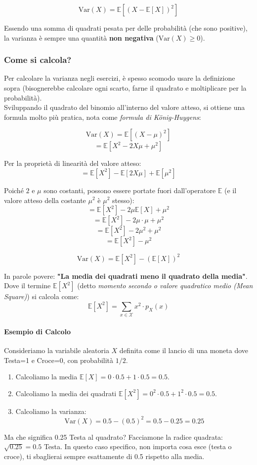 \begin{equation}
\boxed{\text{Var}(X) = \mathbb{E}\left[ (X - \mathbb{E}[X])^2 \right]}
\end{equation}

Essendo una somma di quadrati pesata per delle probabilità (che sono positive), la varianza è sempre una quantità \textbf{non negativa} ($\text{Var}(X) \ge 0$).

\subsubsection{Come si calcola?}

Per calcolare la varianza negli esercizi, è spesso scomodo usare la definizione sopra (bisognerebbe calcolare ogni scarto, farne il quadrato e moltiplicare per la probabilità).
\\Sviluppando il quadrato del binomio all'interno del valore atteso, si ottiene una formula molto più pratica, nota come \textit{formula di König-Huygens}:

$$ \text{Var}(X) = \mathbb{E}[(X - \mu)^2] $$
$$ = \mathbb{E}[X^2 - 2X\mu + \mu^2] $$

Per la proprietà di linearità del valore atteso:
$$ = \mathbb{E}[X^2] - \mathbb{E}[2X\mu] + \mathbb{E}[\mu^2] $$

Poiché $2$ e $\mu$ sono costanti, possono essere portate fuori dall'operatore $\mathbb{E}$ (e il valore atteso della costante $\mu^2$ è $\mu^2$ stesso):
$$ = \mathbb{E}[X^2] - 2\mu \mathbb{E}[X] + \mu^2 $$
$$ = \mathbb{E}[X^2] - 2\mu \cdot \mu + \mu^2 $$
$$ = \mathbb{E}[X^2] - 2\mu^2 + \mu^2 $$
$$ = \mathbb{E}[X^2] - \mu^2 $$

\begin{equation}
\boxed{\text{Var}(X) = \mathbb{E}[X^2] - (\mathbb{E}[X])^2}
\end{equation}

In parole povere: \textbf{"La media dei quadrati meno il quadrato della media"}.
Dove il termine $\mathbb{E}[X^2]$ (detto \textit{momento secondo o valore quadratico medio (Mean Square)}) si calcola come:
\[ \mathbb{E}[X^2] = \sum_{x \in \mathcal{X}} x^2 \cdot p_X(x) \]

\paragraph{Esempio di Calcolo}
Consideriamo la variabile aleatoria $X$ definita come il lancio di una moneta dove Testa=1 e Croce=0, con probabilità $1/2$.
\begin{enumerate}
    \item Calcoliamo la media $\mathbb{E}[X] = 0 \cdot 0.5 + 1 \cdot 0.5 = 0.5$.
    \item Calcoliamo la media dei quadrati $\mathbb{E}[X^2] = 0^2 \cdot 0.5 + 1^2 \cdot 0.5 = 0.5$.
    \item Calcoliamo la varianza:
    \[ \text{Var}(X) = 0.5 - (0.5)^2 = 0.5 - 0.25 = 0.25 \]
\end{enumerate}
Ma che significa 0.25 Testa al quadrato? Facciamone la radice quadrata: $\sqrt{0.25}=0.5$ Testa. In questo caso specifico, non importa cosa esce (testa o croce), ti sbaglierai sempre esattamente di 0.5 rispetto alla media. 

